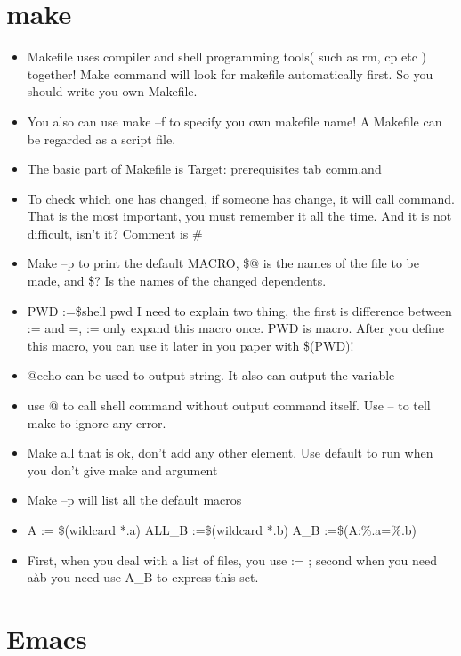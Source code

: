 \documentclass[a4paper,12pt,twoside]{book}
\begin{document}
\begin{CJK*}{UTF8}{song}
\section{make}
	\begin{itemize}
		\item Makefile uses compiler and shell programming tools( such as rm, cp etc ) together!
		Make command will look for makefile automatically first. So you should write you own Makefile.
		\item You also can use make –f to specify you own makefile name!
		A Makefile can be regarded as a script file.
		\item The basic part of Makefile is Target: prerequisites
                        tab comm.and
		\item To check which one has changed,  if someone has change, it will call command. That is the most important, you must remember it all the time. And it is not difficult, isn’t it?
		Comment is \#
		\item Make –p to print the default MACRO, \$@ is the names of the file to be made, and \$? Is the names of the changed dependents.
		\item PWD :=\${shell pwd} I need to explain two thing, the first is difference between := and =, := only expand this macro once. PWD is macro. After you define this macro, you can use it later in you paper with \$(PWD)!
		\item @echo can be used to output string. It also can output the variable
		\item use @ to call shell command without output command itself. Use – to tell make to ignore any error.
		\item Make all that is ok, don’t add any other element. Use default to run when you don’t give make and argument
		\item Make –p will list all the default macros
		\item A := \$(wildcard *.a)  ALL\_B :=\$(wildcard *.b)  A\_B :=\$(A:\%.a=\%.b)
		\item First, when you deal with a list of files, you use := ; second when you need aàb you need use A\_B to express this set.
	\end{itemize}

\section{Emacs}

\end{CJK*}
\end{document}
